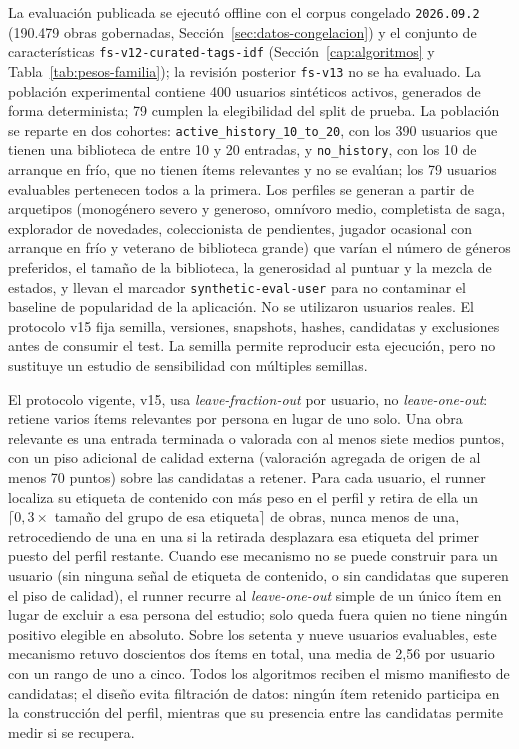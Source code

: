 La evaluación publicada se ejecutó offline con el corpus congelado \texttt{2026.09.2} (190.479 obras
gobernadas, Sección~\ref{sec:datos-congelacion}) y el conjunto de
características \texttt{fs-v12-curated-tags-idf} (Sección~\ref{cap:algoritmos} y
Tabla~\ref{tab:pesos-familia}); la revisión posterior \texttt{fs-v13} no se ha evaluado. La población experimental contiene 400 usuarios sintéticos activos, generados de forma determinista; 79 cumplen la elegibilidad del split de prueba. La población se reparte en dos cohortes: \texttt{active\_history\_10\_to\_20}, con los 390 usuarios que tienen una biblioteca de entre 10 y 20 entradas, y \texttt{no\_history}, con los 10 de arranque en frío, que no tienen ítems relevantes y no se evalúan; los 79 usuarios evaluables pertenecen todos a la primera. Los perfiles se generan a partir de arquetipos (monogénero severo y generoso, omnívoro medio, completista de saga, explorador de novedades, coleccionista de pendientes, jugador ocasional con arranque en frío y veterano de biblioteca grande) que varían el número de géneros preferidos, el tamaño de la biblioteca, la generosidad al puntuar y la mezcla de estados, y llevan el marcador \texttt{synthetic-eval-user} para no contaminar el baseline de popularidad de la aplicación. No se utilizaron usuarios reales. El protocolo v15 fija semilla, versiones, snapshots, hashes, candidatas y exclusiones antes de consumir el test. La semilla permite reproducir esta ejecución, pero no sustituye un estudio de sensibilidad con múltiples semillas.

El protocolo vigente, v15, usa \emph{leave-fraction-out} por usuario, no
\emph{leave-one-out}: retiene varios ítems relevantes por persona en lugar de uno solo. Una
obra relevante es una entrada terminada o valorada con al menos siete medios puntos, con un
piso adicional de calidad externa (valoración agregada de origen de al menos 70 puntos) sobre
las candidatas a retener. Para cada usuario, el runner localiza su etiqueta de contenido con
más peso en el perfil y retira de ella un \(\lceil 0{,}3\times\) tamaño del grupo de esa
etiqueta\(\rceil\) de obras, nunca menos de una, retrocediendo de una en una si la retirada
desplazara esa etiqueta del primer puesto del perfil restante. Cuando ese mecanismo no se
puede construir para un usuario (sin ninguna señal de etiqueta de contenido, o sin candidatas
que superen el piso de calidad), el runner recurre al \emph{leave-one-out} simple de un único
ítem en lugar de excluir a esa persona del estudio; solo queda fuera quien no tiene ningún
positivo elegible en absoluto. Sobre los setenta y nueve usuarios evaluables, este mecanismo
retuvo doscientos dos ítems en total, una media de 2{,}56 por usuario con un rango de uno a
cinco. Todos los algoritmos reciben el mismo manifiesto de candidatas; el diseño evita
filtración de datos: ningún ítem retenido participa en la construcción del perfil, mientras que su
presencia entre las candidatas permite medir si se recupera.

